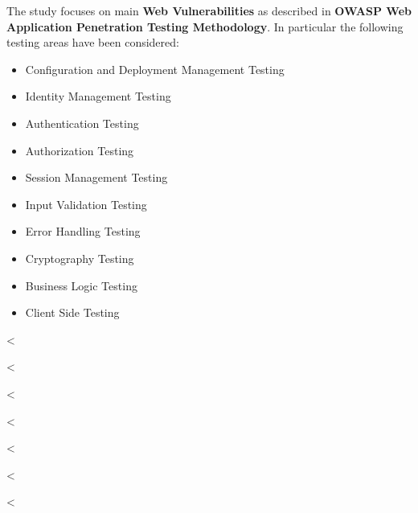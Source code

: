     The study focuses on main \textbf{Web Vulnerabilities} as described in
    \textbf{OWASP Web Application Penetration Testing Methodology}.
    In particular the following testing areas have been considered:

    \begin{itemize}
      \item Configuration and Deployment Management Testing
      \item Identity Management Testing
      \item Authentication Testing
      \item Authorization Testing
      \item Session Management Testing
      \item Input Validation Testing
      \item Error Handling Testing
      \item Cryptography Testing
      \item Business Logic Testing
      \item Client Side Testing
    \end{itemize}

  <%

    <%

  <%

    <%

  <%

    <%


<%
